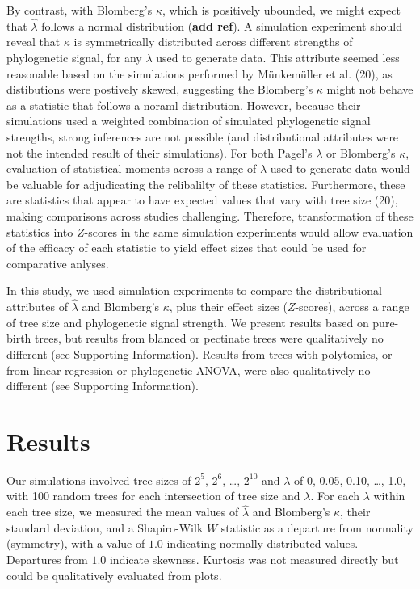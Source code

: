 \documentclass[]{article}
\begin{document}
By contrast, with Blomberg's \(\kappa\), which is positively ubounded,
we might expect that \(\hat{\lambda}\) follows a normal distribution
(\textbf{add ref}). A simulation experiment should reveal that
\(\kappa\) is symmetrically distributed across different strengths of
phylogenetic signal, for any \(\lambda\) used to generate data. This
attribute seemed less reasonable based on the simulations performed by
Münkemüller et al. (20), as distibutions were postively skewed,
suggesting the Blomberg's \(\kappa\) might not behave as a statistic
that follows a noraml distribution. However, because their simulations
used a weighted combination of simulated phylogenetic signal strengths,
strong inferences are not possible (and distributional attributes were
not the intended result of their simulations). For both Pagel's
\(\lambda\) or Blomberg's \(\kappa\), evaluation of statistical moments
across a range of \(\lambda\) used to generate data would be valuable
for adjudicating the relibalilty of these statistics. Furthermore, these
are statistics that appear to have expected values that vary with tree
size (20), making comparisons across studies challenging. Therefore,
transformation of these statistics into \(Z\)-scores in the same
simulation experiments would allow evaluation of the efficacy of each
statistic to yield effect sizes that could be used for comparative
anlyses. \hfill\break

In this study, we used simulation experiments to compare the
distributional attributes of \(\hat{\lambda}\) and Blomberg's
\(\kappa\), plus their effect sizes (\(Z\)-scores), across a range of
tree size and phylogenetic signal strength. We present results based on
pure-birth trees, but results from blanced or pectinate trees were
qualitatively no different (see Supporting Information). Results from
trees with polytomies, or from linear regression or phylogenetic ANOVA,
were also qualitatively no different (see Supporting Information).

\hypertarget{results}{%
\section{Results}\label{results}}

Our simulations involved tree sizes of \(2^5\), \(2^6\), \ldots{},
\(2^{10}\) and \(\lambda\) of 0, 0.05, 0.10, \ldots{}, 1.0, with 100
random trees for each intersection of tree size and \(\lambda\). For
each \(\lambda\) within each tree size, we measured the mean values of
\(\hat{\lambda}\) and Blomberg's \(\kappa\), their standard deviation,
and a Shapiro-Wilk \(W\) statistic as a departure from normality
(symmetry), with a value of \(1.0\) indicating normally distributed
values. Departures from \(1.0\) indicate skewness. Kurtosis was not
measured directly but could be qualitatively evaluated from plots.
\hfill\break
\end{document}

